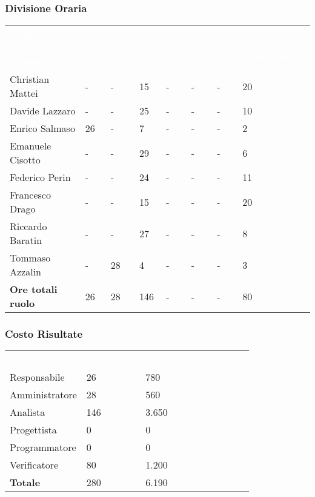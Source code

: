 \subsubsection{Divisione Oraria}
{
	\renewcommand{\arraystretch}{2}
	\centering
	\begin{longtable}{ C{5cm} C{1cm} C{1cm} C{1cm} C{1cm} C{1cm} C{1cm} C{3cm}}
		\textcolor{white}{\textbf{Nome membro del gruppo}} & \textcolor{white}{\textbf{RE}} & \textcolor{white}{\textbf{AM}} & \textcolor{white}{\textbf{AN}} & \textcolor{white}{\textbf{PT}} & \textcolor{white}{\textbf{PR}} & \textcolor{white}{\textbf{VE}} & \textcolor{white}{\textbf{Ore complessive}}\\	
        
        
        Christian Mattei & - & - & 15 & - & - & - & 20 \\
        Davide Lazzaro & - & - & 25 & - & - & - & 10 \\
        Enrico Salmaso & 26 & - & 7 & - & - & - & 2 \\
        Emanuele Cisotto & - & - & 29 & - & - & - & 6 \\
        Federico Perin & - & - & 24 & - & - & - & 11 \\
        Francesco Drago & - & - & 15 & - & - & - & 20 \\
        Riccardo Baratin & - & - & 27 & - & - & - & 8 \\
        Tommaso Azzalin & - & 28 & 4 & - & - & - & 3 \\
        \textbf{Ore totali ruolo} & 26 & 28 & 146 & - & - & - & 80 \\
		
	\end{longtable}
}

\subsubsection{Costo Risultate}
{
	\renewcommand{\arraystretch}{2}
	\centering
	\begin{longtable}{ C{3cm} C{2cm} C{4cm}}
		\textcolor{white}{\textbf{Ruolo}} & \textcolor{white}{\textbf{Totale ore}} & \textcolor{white}{\textbf{Costo Ruolo in euro}}\\	
        
        Responsabile & 26 & 780\\
        Amministratore & 28 & 560\\
        Analista & 146 & 3.650 \\
        Progettista & 0 & 0 \\
        Programmatore & 0 & 0 \\
        Verificatore & 80 & 1.200 \\
        \textbf{Totale} & 280 & 6.190 \\
		
	\end{longtable}
}

